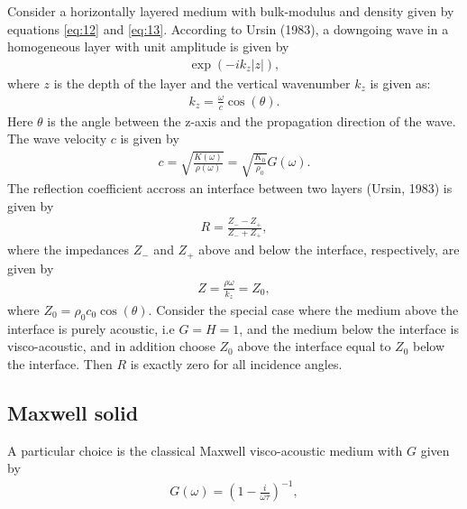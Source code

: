\documentclass[11pt]{article}
\begin{document}
{ Consider a horizontally layered medium with bulk-modulus and density
 given by equations \ref{eq:12} and \ref{eq:13}. According to Ursin
 (1983), a downgoing wave in a homogeneous layer with unit amplitude is given by
\begin{eqnarray}
 \exp(-ik_z |z|),
                               \label{eq:16}
\end{eqnarray}
where $z$ is the depth of the layer and the vertical wavenumber $k_z$
is given as:
\begin{eqnarray}
 k_z = \frac{\omega}{c}\cos(\theta).
                               \label{eq:17}
\end{eqnarray}
Here $\theta$ is the angle between the z-axis and the propagation
direction of the wave.
The wave velocity $c$ is given
by
\begin{eqnarray}
 c=\sqrt{\frac{K(\omega)}{\rho(\omega)}} = 
 \sqrt{\frac{K_0}{\rho_0}}G(\omega).
                               \label{eq:18}
\end{eqnarray}
 The reflection coefficient
 accross an interface between two layers (Ursin, 1983) is given by
\begin{eqnarray}
  R = \frac{Z_- - Z_+}{Z_ - + Z_+}, 
                               \label{eq:19}
\end{eqnarray}
where the impedances $Z_-$ and $Z_+$ above and below the interface,
respectively, are given by
\begin{eqnarray}
 Z = \frac{\rho\omega}{k_z} = Z_0 ,
\end{eqnarray}
where $Z_0 = \rho_0 c_0\cos(\theta)$.
Consider the special case where the medium above the interface is
purely acoustic, i.e $G=H=1$, and the medium below the interface is
visco-acoustic, and in addition choose $Z_0$ above the interface equal
to $Z_0$ below the interface. Then $R$ is exactly zero for all incidence
angles.
\subsection*{Maxwell solid}
A particular choice is the classical Maxwell visco-acoustic
medium with $G$ given by \citep{Casula1992}
\begin{eqnarray}
 G(\omega) = \left({1-\frac{i}{\omega\tau}}\right)^{-1},
                                    \label{eq:21}
\end{eqnarray}

}
\end{document}
